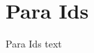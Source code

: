 

\section{Para Ids}\fbeg{}\begin{frame}{}

{\fontsize{20}{23}\selectfont

Para Ids text

}

\end{frame}


